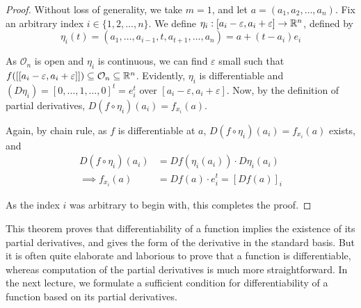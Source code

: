 \documentclass[../Analysis-3.tex]{subfiles}
\begin{document}
\begin{proof}
  Without loss of generality, we take $m = 1$, and let $a = (a_1, a_2, \dots, a_n)$. Fix an arbitrary index $i \in \{1,2,\dots,n \}$. We define $\eta_i : [a_i - \varepsilon,a_i + \varepsilon] \to \mathbb{R}^n$, defined by
  \[\eta_i(t) = (a_1, \dots, a_{i-1}, t, a_{t+1}, \dots, a_n) = a + (t-a_i)e_i \]

  As $\mathcal{O}_n$ is open and $\eta_i$ is continuous, we can find $\varepsilon$ small such that $f([[a_i - \varepsilon,a_i + \varepsilon]]) \subseteq \mathcal{O}_n \subseteq \mathbb{R}^n$. Evidently, $\eta_i$ is differentiable and $(D\eta_i) = [0,\dots,1,\dots,0]^t = e_i^t$ over $[a_i - \varepsilon,a_i + \varepsilon]$. Now, by the definition of partial derivatives, \(D(f\circ\eta_i)(a_i) = f_{x_i} (a)\).

  Again, by chain rule, as $f$ is differentiable at $a$, $D(f\circ\eta_i)(a_i) = f_{x_i}(a)$ exists, and
  \begin{align*}
    D(f\circ\eta_i)(a_i) & = Df(\eta_i(a_i)) \cdot D\eta_i (a_i) \\
    \implies f_{x_i} (a) & = Df(a) \cdot e_i^t = [Df(a)]_i
  \end{align*}

  As the index $i$ was arbitrary to begin with, this completes the proof.
\end{proof}

This theorem proves that differentiability of a function implies the existence of its partial derivatives, and gives the form of the derivative in the standard basis. But it is often quite elaborate and laborious to prove that a function is differentiable, whereas computation of the partial derivatives is much more straightforward. In the next lecture, we formulate a sufficient condition for differentiability of a function based on its partial derivatives.
\end{document}
